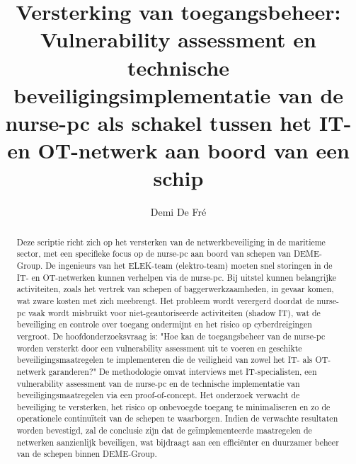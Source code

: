 \documentclass{hogent-article}
\title{Versterking van toegangsbeheer: Vulnerability assessment en 
technische beveiligingsimplementatie van de nurse-pc als schakel tussen het IT- en OT-netwerk aan boord van een schip}
\author{Demi De Fré}
\begin{document}
\begin{abstract}
  Deze scriptie richt zich op het versterken van de netwerkbeveiliging in de maritieme sector, met een specifieke focus op de nurse-pc aan boord van schepen van DEME-Group. 
  De ingenieurs van het ELEK-team (elektro-team) moeten snel storingen in de IT- en OT-netwerken kunnen verhelpen via de nurse-pc. 
  Bij uitstel kunnen belangrijke activiteiten, zoals het vertrek van schepen of baggerwerkzaamheden, in gevaar komen, wat zware kosten met zich meebrengt. 
  Het probleem wordt verergerd doordat de nurse-pc vaak wordt misbruikt voor niet-geautoriseerde activiteiten (shadow IT), wat de beveiliging en controle over toegang 
  ondermijnt en het risico op cyberdreigingen vergroot. De hoofdonderzoeksvraag is: "Hoe kan de toegangsbeheer van de nurse-pc worden versterkt door een vulnerability 
  assessment uit te voeren en geschikte beveiligingsmaatregelen te implementeren die de veiligheid van zowel het IT- als OT-netwerk garanderen?" 
  De methodologie omvat interviews met IT-specialisten, een vulnerability assessment van de nurse-pc en de technische implementatie van beveiligingsmaatregelen via een proof-of-concept. 
  Het onderzoek verwacht de beveiliging te versterken, het risico op onbevoegde toegang te minimaliseren en zo de operationele continuïteit van de schepen te waarborgen. 
  Indien de verwachte resultaten worden bevestigd, zal de conclusie zijn dat de geïmplementeerde maatregelen de netwerken aanzienlijk beveiligen, wat bijdraagt aan een efficiënter en duurzamer 
  beheer van de schepen binnen DEME-Group.
\end{abstract}

\tableofcontents



\printbibliography[heading=bibintoc]
\end{document}
